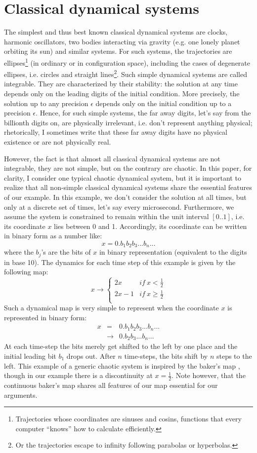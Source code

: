 \documentclass[pra,aps,groupedaddress,twocolumn,floatfix,nofootinbib]{revtex4}
\newcommand{\beq}{\begin{equation}}
\newcommand{\eeq}{\end{equation}}
\newcommand{\beqa}{\begin{eqnarray}}
\newcommand{\eeqa}{\end{eqnarray}}
\def\half{\frac{1}{2}}
\begin{document}
\section{Classical dynamical systems}\label{cds}
The simplest and thus best known classical dynamical systems are clocks, harmonic oscillators, two bodies interacting via gravity (e.g. one lonely planet orbiting its sun) and similar systems. For such systems, the trajectories are ellipses\footnote{Trajectories whose coordinates are sinuses and cosins, functions that every computer ``knows'' how to calculate efficiently.} (in ordinary or in configuration space), including the cases of degenerate ellipses, i.e. circles and straight lines\footnote{Or the trajectories escape to infinity following parabolas or hyperbolas.}. Such simple dynamical systems are called integrable. They are characterized by their stability: the solution at any time depends only on the leading digits of the initial condition. More precisely, the solution up to any precision $\epsilon$ depends only on the initial condition up to a precision $\epsilon$. Hence, for such simple systems, the far away digits, let's say from the billionth digits on, are physically irrelevant, i.e. don't represent anything physical; rhetorically, I sometimes write that these far away digits have no physical existence or are not physically real. 

However, the fact is that almost all classical dynamical systems are not integrable, they are not simple, but on the contrary are chaotic. In this paper, for clarity, I consider one typical chaotic dynamical system, but it is important to realize that all non-simple classical dynamical systems share the essential features of our example. In this example, we don't consider the solution at all times, but only at a discrete set of times, let's say every microsecond. Furthermore, we assume the system is constrained to remain within the unit interval $[0..1]$, i.e. its coordinate $x$ lies between 0 and 1. Accordingly, its coordinate can be written in binary form as a number like:
\beq\label{x0}
x=0.b_1b_2b_3...b_n...
\eeq
where the $b_j$'s are the bits of $x$ in binary representation (equivalent to the digits in base 10). The dynamics for each time step of this example is given by the following map:
\beq
x\rightarrow\left\{
\begin{array}{ll}
2x & if\ x<\half \\%
2x-1 & if\ x\ge\half \\
\end{array}\right.
\eeq
Such a dynamical map is very simple to represent when the coordinate $x$ is represented in binary form:
\beqa\label{map}
x&=&0.b_1b_2b_3...b_n... \nonumber\\
&\rightarrow& 0.b_2b_3...b_n...
\eeqa
At each time-step the bits merely get shifted to the left by one place and the initial leading bit $b_1$ drops out. After $n$ time-steps, the bits shift by $n$ steps to the left. This example of a generic chaotic system is inspired by the baker's map \cite{baker}, though in our example there is a discontinuity at $x=\half$. Note however, that the continuous baker's map shares all features of our map essential for our arguments.
\end{document}
